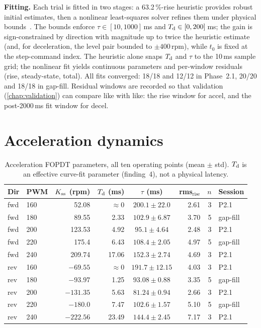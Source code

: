 \textbf{Fitting.} Each trial is fitted in two stages: a 63.2\,\%-rise heuristic provides robust initial estimates, then a nonlinear least-squares solver refines them under physical bounds~\citep{ljung1999}. The bounds enforce $\tau \in [10, 1000]$\,ms and $T_{\mathrm{d}} \in [0, 200]$\,ms; the gain is sign-constrained by direction with magnitude up to twice the heuristic estimate (and, for deceleration, the level pair bounded to $\pm 400$\,rpm), while $t_0$ is fixed at the step-command index. The heuristic alone snaps $T_{\mathrm{d}}$ and $\tau$ to the 10\,ms sample grid; the nonlinear fit yields continuous parameters and per-window residuals (rise, steady-state, total). All fits converged: 18/18 and 12/12 in Phase~2.1, 20/20 and 18/18 in gap-fill. Residual windows are recorded so that validation (\cref{chap:validation}) can compare like with like: the rise window for accel, and the post-2000\,ms fit window for decel.

\section{Acceleration dynamics}
\label{sec:accel}

\begin{table}[t]
  \centering
  \caption{Acceleration FOPDT parameters, all ten operating points (mean $\pm$ std). $T_{\mathrm{d}}$ is an effective curve-fit parameter (finding~4), not a physical latency.}
  \label{tab:accel}
  \small
  \begin{tabular}{@{}llrrcrrl@{}}
    \toprule
    Dir & PWM & $K_{\mathrm{ss}}$ (rpm) & $T_{\mathrm{d}}$ (ms) & $\tau$ (ms) & rms$_{\mathrm{rise}}$ & $n$ & Session \\
    \midrule
    fwd & 160 & 52.08    & ${\approx}0$ & $200.1 \pm 22.0$ & 2.61 & 3 & P2.1 \\
    fwd & 180 & 89.55    & 2.33  & $102.9 \pm 6.87$ & 3.70 & 5 & gap-fill \\
    fwd & 200 & 123.53   & 4.92  & $95.1 \pm 4.64$  & 2.48 & 3 & P2.1 \\
    fwd & 220 & 175.4    & 6.43  & $108.4 \pm 2.05$ & 4.97 & 5 & gap-fill \\
    fwd & 240 & 209.74   & 17.06 & $152.3 \pm 2.74$ & 4.69 & 3 & P2.1 \\
    rev & 160 & $-69.55$ & ${\approx}0$ & $191.7 \pm 12.15$ & 4.03 & 3 & P2.1 \\
    rev & 180 & $-93.97$ & 1.25  & $93.08 \pm 0.88$ & 3.35 & 5 & gap-fill \\
    rev & 200 & $-131.35$& 5.63  & $81.24 \pm 0.94$ & 2.66 & 3 & P2.1 \\
    rev & 220 & $-180.0$ & 7.47  & $102.6 \pm 1.57$ & 5.10 & 5 & gap-fill \\
    rev & 240 & $-222.56$& 23.49 & $144.4 \pm 2.45$ & 7.17 & 3 & P2.1 \\
    \bottomrule
  \end{tabular}
\end{table}

